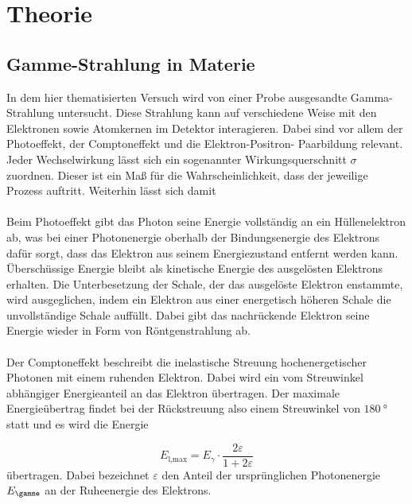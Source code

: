 \section{Theorie}
\label{sec:Theorie}


\subsection{Gamme-Strahlung in Materie}
\label{subsec:t1}

In dem hier thematisierten Versuch wird von einer Probe ausgesandte Gamma-Strahlung untersucht.
Diese Strahlung kann auf verschiedene Weise mit den Elektronen sowie Atomkernen im Detektor
interagieren.
Dabei sind vor allem der Photoeffekt, der Comptoneffekt und die Elektron-Positron-
Paarbildung relevant.
Jeder Wechselwirkung lässt sich ein sogenannter Wirkungsquerschnitt
$\sigma$ zuordnen. Dieser ist ein Maß für die Wahrscheinlichkeit,
dass der jeweilige Prozess auftritt. Weiterhin lässt sich damit \\ \\
Beim Photoeffekt gibt das Photon seine Energie vollständig an ein Hüllenelektron ab, was bei
einer Photonenergie oberhalb der Bindungsenergie des Elektrons dafür sorgt, dass das Elektron
aus seinem Energiezustand entfernt werden kann. Überschüssige Energie bleibt als kinetische
Energie des ausgelösten Elektrons erhalten. Die Unterbesetzung der Schale, der das ausgelöste
Elektron enstammte, wird ausgeglichen, indem ein Elektron aus einer energetisch höheren Schale
die unvollständige Schale auffüllt. Dabei gibt das nachrückende Elektron seine Energie wieder
in Form von Röntgenstrahlung ab. \\ \\
Der Comptoneffekt beschreibt die inelastische Streuung hochenergetischer Photonen mit einem
ruhenden Elektron.
Dabei wird ein vom Streuwinkel abhängiger Energieanteil an das Elektron übertragen.
Der maximale Energieübertrag findet bei der Rückstreuung also einem Streuwinkel
von $\SI{180}{\degree}$ statt und es wird die Energie

\begin{equation}
  \label{eqn:e1t1}
  E_\text{l,max} = E_{\gamma} \cdot \frac{2\varepsilon}{1 + 2\varepsilon}
\end{equation}
übertragen. Dabei bezeichnet $\varepsilon$ den Anteil der ursprünglichen
Photonenergie $E_{\gamme}$ an der Ruheenergie des Elektrons.

\cite{sample}
